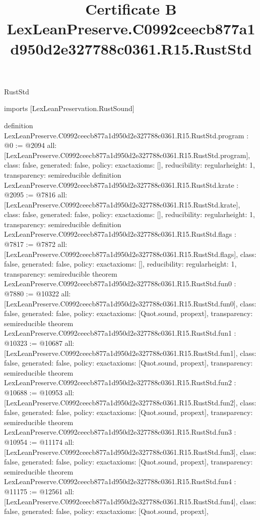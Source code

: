 \begin{lexlean}{RustStd}
\title{Certificate B LexLeanPreserve.C0992ceecb877a1d950d2e327788c0361.R15.RustStd}
\begin{coremodule}
imports [LexLeanPreservation.RustSound]

definition LexLeanPreserve.C0992ceecb877a1d950d2e327788c0361.R15.RustStd.program : @0 := @2094 {
  all: [LexLeanPreserve.C0992ceecb877a1d950d2e327788c0361.R15.RustStd.program],
  class: false,
  generated: false,
  policy: exact{axioms: []},
  reducibility: regular{height: 1},
  transparency: semireducible
}
definition LexLeanPreserve.C0992ceecb877a1d950d2e327788c0361.R15.RustStd.krate : @2095 := @7816 {
  all: [LexLeanPreserve.C0992ceecb877a1d950d2e327788c0361.R15.RustStd.krate],
  class: false,
  generated: false,
  policy: exact{axioms: []},
  reducibility: regular{height: 1},
  transparency: semireducible
}
definition LexLeanPreserve.C0992ceecb877a1d950d2e327788c0361.R15.RustStd.flags : @7817 := @7872 {
  all: [LexLeanPreserve.C0992ceecb877a1d950d2e327788c0361.R15.RustStd.flags],
  class: false,
  generated: false,
  policy: exact{axioms: []},
  reducibility: regular{height: 1},
  transparency: semireducible
}
theorem LexLeanPreserve.C0992ceecb877a1d950d2e327788c0361.R15.RustStd.fun0 : @7880 := @10322 {
  all: [LexLeanPreserve.C0992ceecb877a1d950d2e327788c0361.R15.RustStd.fun0],
  class: false,
  generated: false,
  policy: exact{axioms: [Quot.sound, propext]},
  transparency: semireducible
}
theorem LexLeanPreserve.C0992ceecb877a1d950d2e327788c0361.R15.RustStd.fun1 : @10323 := @10687 {
  all: [LexLeanPreserve.C0992ceecb877a1d950d2e327788c0361.R15.RustStd.fun1],
  class: false,
  generated: false,
  policy: exact{axioms: [Quot.sound, propext]},
  transparency: semireducible
}
theorem LexLeanPreserve.C0992ceecb877a1d950d2e327788c0361.R15.RustStd.fun2 : @10688 := @10953 {
  all: [LexLeanPreserve.C0992ceecb877a1d950d2e327788c0361.R15.RustStd.fun2],
  class: false,
  generated: false,
  policy: exact{axioms: [Quot.sound, propext]},
  transparency: semireducible
}
theorem LexLeanPreserve.C0992ceecb877a1d950d2e327788c0361.R15.RustStd.fun3 : @10954 := @11174 {
  all: [LexLeanPreserve.C0992ceecb877a1d950d2e327788c0361.R15.RustStd.fun3],
  class: false,
  generated: false,
  policy: exact{axioms: [Quot.sound, propext]},
  transparency: semireducible
}
theorem LexLeanPreserve.C0992ceecb877a1d950d2e327788c0361.R15.RustStd.fun4 : @11175 := @12561 {
  all: [LexLeanPreserve.C0992ceecb877a1d950d2e327788c0361.R15.RustStd.fun4],
  class: false,
  generated: false,
  policy: exact{axioms: [Quot.sound, propext]},
}
\end{coremodule}
\end{lexlean}
